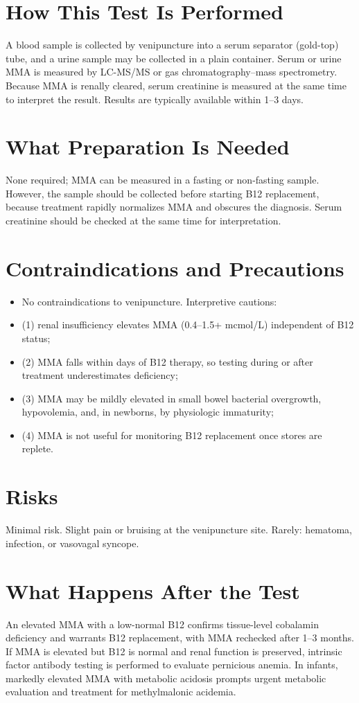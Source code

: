 \section*{How This Test Is Performed}
A blood sample is collected by venipuncture into a serum separator (gold-top) tube, and a urine sample may be collected in a plain container. Serum or urine MMA is measured by LC-MS/MS or gas chromatography--mass spectrometry. Because MMA is renally cleared, serum creatinine is measured at the same time to interpret the result. Results are typically available within 1--3 days.
\section*{What Preparation Is Needed}
None required; MMA can be measured in a fasting or non-fasting sample. However, the sample should be collected before starting B12 replacement, because treatment rapidly normalizes MMA and obscures the diagnosis. Serum creatinine should be checked at the same time for interpretation.
\section*{Contraindications and Precautions}
\begin{itemize}
  \item No contraindications to venipuncture. Interpretive cautions:
  \item (1) renal insufficiency elevates MMA (0.4--1.5+ mcmol/L) independent of B12 status;
  \item (2) MMA falls within days of B12 therapy, so testing during or after treatment underestimates deficiency;
  \item (3) MMA may be mildly elevated in small bowel bacterial overgrowth, hypovolemia, and, in newborns, by physiologic immaturity;
  \item (4) MMA is not useful for monitoring B12 replacement once stores are replete.
\end{itemize}
\section*{Risks}
Minimal risk. Slight pain or bruising at the venipuncture site. Rarely: hematoma, infection, or vasovagal syncope.
\section*{What Happens After the Test}
An elevated MMA with a low-normal B12 confirms tissue-level cobalamin deficiency and warrants B12 replacement, with MMA rechecked after 1--3 months. If MMA is elevated but B12 is normal and renal function is preserved, intrinsic factor antibody testing is performed to evaluate pernicious anemia. In infants, markedly elevated MMA with metabolic acidosis prompts urgent metabolic evaluation and treatment for methylmalonic acidemia.
